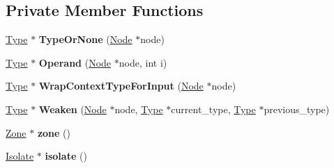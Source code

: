 \subsection*{Private Member Functions}
\begin{DoxyCompactItemize}
\item 
\hyperlink{classv8_1_1internal_1_1_type}{Type} $\ast$ {\bfseries Type\+Or\+None} (\hyperlink{classv8_1_1internal_1_1compiler_1_1_node}{Node} $\ast$node)\hypertarget{classv8_1_1internal_1_1compiler_1_1_typer_1_1_visitor_ad7cc590482472e07db79b84beb854427}{}\label{classv8_1_1internal_1_1compiler_1_1_typer_1_1_visitor_ad7cc590482472e07db79b84beb854427}

\item 
\hyperlink{classv8_1_1internal_1_1_type}{Type} $\ast$ {\bfseries Operand} (\hyperlink{classv8_1_1internal_1_1compiler_1_1_node}{Node} $\ast$node, int i)\hypertarget{classv8_1_1internal_1_1compiler_1_1_typer_1_1_visitor_a0a0edbadc48d41feb5dea0c419448252}{}\label{classv8_1_1internal_1_1compiler_1_1_typer_1_1_visitor_a0a0edbadc48d41feb5dea0c419448252}

\item 
\hyperlink{classv8_1_1internal_1_1_type}{Type} $\ast$ {\bfseries Wrap\+Context\+Type\+For\+Input} (\hyperlink{classv8_1_1internal_1_1compiler_1_1_node}{Node} $\ast$node)\hypertarget{classv8_1_1internal_1_1compiler_1_1_typer_1_1_visitor_ac8904991860d017debab5bba7a417455}{}\label{classv8_1_1internal_1_1compiler_1_1_typer_1_1_visitor_ac8904991860d017debab5bba7a417455}

\item 
\hyperlink{classv8_1_1internal_1_1_type}{Type} $\ast$ {\bfseries Weaken} (\hyperlink{classv8_1_1internal_1_1compiler_1_1_node}{Node} $\ast$node, \hyperlink{classv8_1_1internal_1_1_type}{Type} $\ast$current\+\_\+type, \hyperlink{classv8_1_1internal_1_1_type}{Type} $\ast$previous\+\_\+type)\hypertarget{classv8_1_1internal_1_1compiler_1_1_typer_1_1_visitor_a572db2948b37f131c17df102178e9475}{}\label{classv8_1_1internal_1_1compiler_1_1_typer_1_1_visitor_a572db2948b37f131c17df102178e9475}

\item 
\hyperlink{classv8_1_1internal_1_1_zone}{Zone} $\ast$ {\bfseries zone} ()\hypertarget{classv8_1_1internal_1_1compiler_1_1_typer_1_1_visitor_af3d9c235c28dd56f96168718c18a485b}{}\label{classv8_1_1internal_1_1compiler_1_1_typer_1_1_visitor_af3d9c235c28dd56f96168718c18a485b}

\item 
\hyperlink{classv8_1_1internal_1_1_isolate}{Isolate} $\ast$ {\bfseries isolate} ()\hypertarget{classv8_1_1internal_1_1compiler_1_1_typer_1_1_visitor_a05d99a1ea442848949fff46fb24f122d}{}\label{classv8_1_1internal_1_1compiler_1_1_typer_1_1_visitor_a05d99a1ea442848949fff46fb24f122d}


\end{DoxyCompactItemize}
